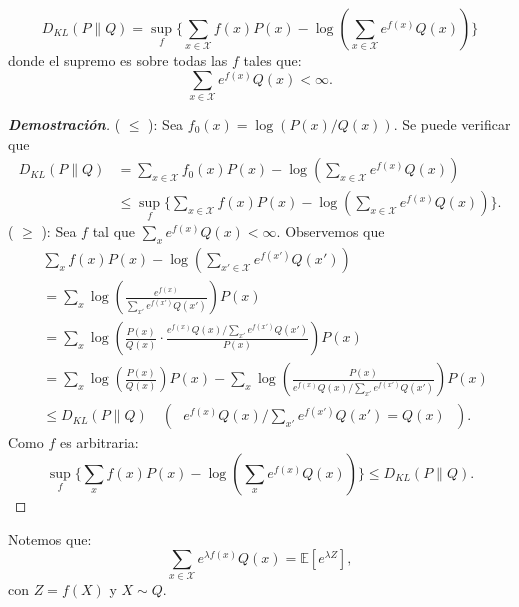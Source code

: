 \begin{theorem}
    \begin{equation*}
        D_{KL}(P\|Q)=\sup_f\Biggl\{\sum_{x\in\mathcal{X}}f(x)P(x)-\log\left(\sum_{x\in\mathcal{X}}e^{f(x)}Q(x)\right)\Biggl\}
    \end{equation*}
donde el supremo es sobre todas las $f$ tales que:
\begin{equation*}
    \sum_{x\in\mathcal{X}}e^{f(x)}Q(x)<\infty.
\end{equation*}
\end{theorem}
\begin{proof}[\textbf{Demostraci\'on}]
( $\leq$ ): Sea $f_0(x)=\log(P(x)/Q(x))$. Se puede verificar que 
\begin{align*}
    D_{KL}(P\|Q)&=\sum_{x\in\mathcal{X}}f_0(x)P(x)-\log\left(\sum_{x\in\mathcal{X}}e^{f(x)}Q(x)\right)\\
    &\leq\sup_{f}\Biggl\{\sum_{x\in\mathcal{X}}f(x)P(x)-\log\left(\sum_{x\in\mathcal{X}}e^{f(x)}Q(x)\right)\Biggl\}.
\end{align*}
\noindent( $\geq$ ): Sea $f$ tal que $\sum_{x}e^{f(x)}Q(x)<\infty$. Observemos que
\begin{align*}
    &\sum_{x}f(x)P(x)-\log\left(\sum_{x'\in\mathcal{X}}e^{f(x')}Q(x')\right)\\
    &=\sum_{x}\log\left(\frac{e^{f(x)}}{\sum_{x'}e^{f(x')}Q(x')}\right)P(x)\\
    &=\sum_x\log\left(\frac{P(x)}{Q(x)}\cdot\frac{e^{f(x)}Q(x)/\sum_{x'}e^{f(x')}Q(x')}{P(x)}\right)P(x)\\
    &=\sum_x\log\left(\frac{P(x)}{Q(x)}\right)P(x)-\sum_{x}\log\left(\frac{P(x)}{e^{f(x)}Q(x)/\sum_{x'}e^{f(x')}Q(x')}\right)P(x)\\
    &\leq D_{KL}(P\|Q)\quad\left(\text{ $e^{f(x)}Q(x)/\sum_{x'}e^{f(x')}Q(x')=Q(x)$ }\right).
\end{align*}
Como $f$ es arbitraria:
\begin{equation*}
    \sup_f\Biggl\{\sum_{x}f(x)P(x)-\log\left(\sum_xe^{f(x)}Q(x)\right)\Biggl\}\leq D_{KL}(P\|Q).
\end{equation*}
\end{proof}

\begin{observation}
Notemos que:
\begin{equation*}
    \sum_{x\in\mathcal{X}}e^{\lambda f(x)}Q(x)=\mathbb{E}\left[e^{\lambda Z}\right],
\end{equation*}
con $Z=f(X)$ y $X\sim Q$.
\end{observation}

